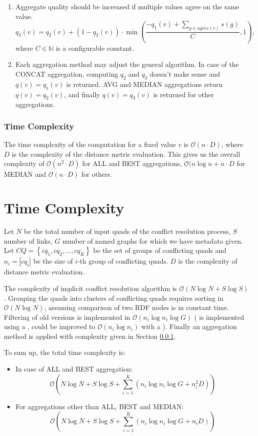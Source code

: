 \begin{enumerate}
	\item Aggregate quality should be increased if multiple values agree on the same value.
		$$q_3(v) = q_2(v)+(1-q_2(v))\cdot \min \left(\frac{-q_1(v)+\sum_{g\in agree(v)} s(g)}{C}, 1\right),$$
		where $C\in\mathbb{N}$ is a configurable constant.
	\item Each aggregation method may adjust the general algorithm. In case of the CONCAT aggregation, computing $q_2$ and $q_3$ doesn't make sense and $q(v)=q_1(v)$ is returned. AVG and MEDIAN aggregations return $q(v)=q_2(v)$, and finally $q(v)=q_3(v)$ is returned for other aggregations.
\end{enumerate}

\subsubsection{Time Complexity}
\label{aggrTimeComplexity}
The time complexity of the \aggrq computation for a fixed value $v$ is $\mathcal{O}(n\cdot D)$, where $D$ is the complexity of the distance metric evaluation. This gives us the overall complexity of $\mathcal{O} (n^2 \cdot D)$ for ALL and BEST aggregations, $\mathcal{O}(n \log n + n \cdot D$ for MEDIAN and $\mathcal{O}(n\cdot D)$ for others.

\section{Time Complexity}
Let $N$ be the total number of input quads of the conflict resolution process, $S$ number of  links, $G$ number of named graphs for which we have metadata given. Let $CQ=\left\{cq_1, cq_2, \ldots, cq_K\right\}$ be the set of groups of conflicting quads and $n_i=|cq_i|$ be the size of $i$-th group of conflicting quads. $D$ is the complexity of distance metric evaluation.

The complexity of implicit conflict resolution algorithm is $\mathcal{O}(N \log N + S\log S)$. Grouping the quads into clusters of conflicting quads requires sorting in $\mathcal{O}(N \log N)$, assuming comparison of two RDF nodes is in constant time. Filtering of old versions is implemented in $\mathcal{O}(n_i \log n_i \log G)$ ( is implemented using a , could be improved to $\mathcal{O}(n_i\log n_i)$ with a ). Finally an aggregation method is applied with complexity given in Section \ref{aggrTimeComplexity}.

To sum up, the total time complexity is:
\begin{itemize}
	\item In case of ALL and BEST aggregation:
		$$ \mathcal{O}\left(N \log N + S\log S + \sum_{i=1}^K \left(n_i \log n_i \log G + n_i^2 D\right)\right)$$
	\item For aggregations other than ALL, BEST and MEDIAN:
	$$ \mathcal{O}\left(N \log N + S\log S + \sum_{i=1}^K \left(n_i \log n_i \log G + n_i D\right)\right)$$
\end{itemize}

